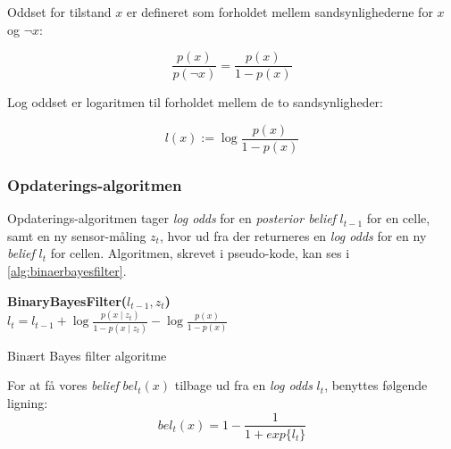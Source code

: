 Oddset for tilstand $x$ er defineret som forholdet mellem sandsynlighederne for $x$ og $\lnot x$:

\begin{equation}
\frac{p(x)}{p(\lnot x)} = \frac{p(x)}{1 - p(x)}
\end{equation}

Log oddset er logaritmen til forholdet mellem de to sandsynligheder:

\begin{equation}
l(x) := \log \frac{p(x)}{1 - p(x)}
\end{equation}

\subsubsection{Opdaterings-algoritmen}
Opdaterings-algoritmen tager \textit{log odds} for en \textit{posterior belief} $l_{t-1}$ for en celle, samt en ny sensor-måling $z_t$, hvor ud fra der returneres en \textit{log odds} for en ny \textit{belief} $l_t$ for cellen.
Algoritmen, skrevet i pseudo-kode, kan ses i \cref{alg:binaerbayesfilter}.

\begin{algorithm}[h]
\textbf{BinaryBayesFilter($l_{t-1}, z_t$)} \\
\Indp $l_t = l_{t-1} + \log \frac{p(x \mid z_t)}{1-p(x \mid z_t)} - \log \frac{p(x)}{1-p(x)}$ \\
\caption{Binært Bayes filter algoritme}
\label{alg:binaerbayesfilter}
\end{algorithm}


For at få vores \textit{belief} $bel_t(x)$ tilbage ud fra en \textit{log odds} $l_t$, benyttes følgende ligning:
\begin{equation}
bel_t(x) = 1 - \frac{1}{1 + exp\{l_t\}}
\end{equation}
